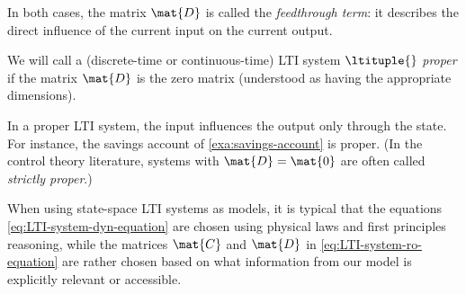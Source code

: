 In both cases, the matrix $\mat{D}$ is called the \emph{feedthrough term}: it describes the direct influence of the current input on the current output.

\begin{definition}
    \label{def:prop_LTI_syst}
    We will call a (discrete-time or continuous-time) LTI system $\ltituple{}$ \emph{proper} if the matrix $\mat{D}$ is the zero matrix (understood as having the appropriate dimensions).
\end{definition}

In a proper LTI system, the input influences the output only through the state.
For instance, the savings account of \cref{exa:savings-account} is proper.
(In the control theory literature, systems with $\mat{D} = \mat{0}$ are often called \emph{strictly proper}.)

\begin{remark}
    When using state-space LTI systems as models, it is typical that the equations \cref{eq:LTI-system-dyn-equation} are chosen using physical laws and first principles reasoning, while the matrices $\mat{C}$ and $\mat{D}$ in \cref{eq:LTI-system-ro-equation} are rather chosen based on what information from our model is explicitly relevant or accessible.
\end{remark}

